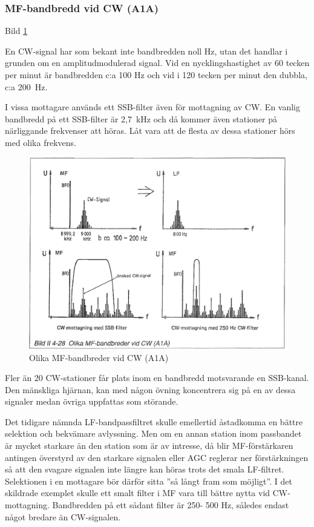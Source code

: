 \subsubsection{MF-bandbredd vid  CW (A1A)}

Bild \ref{fig:bildII4-28}

En CW-signal har som bekant inte bandbredden noll Hz, utan det handlar
i grunden om en amplitudmodulerad signal. Vid en nycklingshastighet av
60 tecken per minut är bandbredden c:a 100 Hz och vid i 120 tecken per minut
den dubbla, c:a 200~Hz.

I vissa mottagare används ett SSB-filter även för mottagning av CW. En
vanlig bandbredd på ett SSB-filter är 2,7~kHz och då kommer även
stationer på närliggande frekvenser att höras. Låt vara att de flesta
av dessa stationer hörs med olika frekvens.

\begin{figure}
  \includegraphics[width=\textwidth]{images/bild_2_4-28}
  \caption{Olika MF-bandbreder vid CW (A1A)}
  \label{fig:bildII4-28}
\end{figure}

Fler än 20 CW-stationer får plats inom en bandbredd motsvarande en
SSB-kanal. Den mänskliga hjärnan, kan med någon övning koncentrera sig
på en av dessa signaler medan övriga uppfattas som störande.

Det tidigare nämnda LF-bandpassfiltret skulle emellertid åstadkomma en
bättre selektion och bekvämare avlyssning. Men om en annan station
inom passbandet är mycket starkare än den station som är av intresse,
då blir MF-förstärkaren antingen överstyrd av den starkare signalen
eller AGC reglerar ner förstärkningen så att den svagare signalen inte
längre kan höras trots det smala LF-filtret. Selektionen i en
mottagare bör därför sitta ''så långt fram som möjligt''. I det
skildrade exemplet skulle ett smalt filter i MF vara till bättre nytta
vid CW-mottagning. Bandbredden på ett sådant filter är 250- 500 Hz,
således endast något bredare än CW-signalen.

